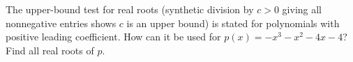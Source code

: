 The upper-bound test for real roots (synthetic division by $c>0$ giving all nonnegative entries shows $c$ is an upper bound) is stated for polynomials with positive leading coefficient. How can it be used for $p(x)=-x^3-x^2-4x-4$? Find all real roots of $p$.
